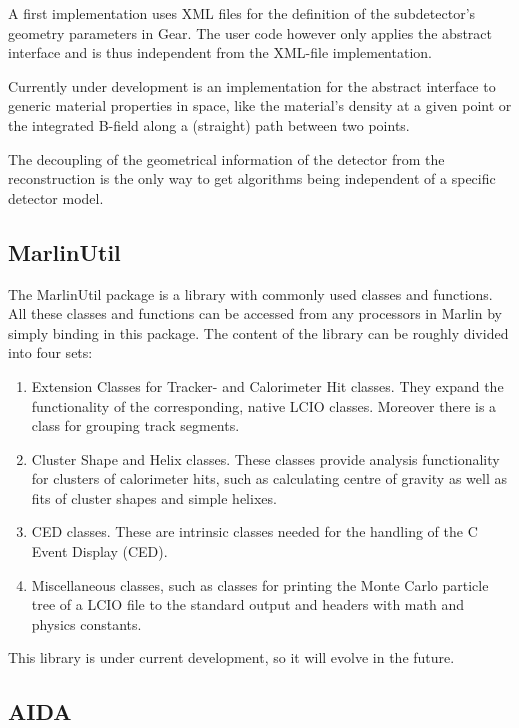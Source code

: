 A first implementation uses XML files for the definition of the
subdetector's geometry parameters in Gear. The user code however only applies
the abstract interface and is thus independent from the XML-file
implementation.

Currently under development is an
implementation for the abstract interface to generic material
properties in space, like the material's density at a given point or
the integrated B-field along a (straight) path between two points.

The decoupling of the geometrical
information of the detector from the reconstruction is the only way to get
algorithms being independent of a specific detector model.

\subsection{MarlinUtil}

The MarlinUtil package is a library with commonly used classes and functions.
All these classes and functions can be accessed from any processors in
Marlin by simply binding in this package. The content of the library can be
roughly divided into four sets:

\begin{enumerate}
\item Extension Classes for Tracker- and Calorimeter Hit classes.
      They expand the functionality of the corresponding, native LCIO classes.
      Moreover there is a class for grouping track segments.
\item Cluster Shape and Helix classes. These classes provide analysis
      functionality for clusters of calorimeter hits, such as calculating
      centre of gravity as well as fits of cluster shapes and simple helixes.
\item CED classes. These are intrinsic classes needed for the handling of the
      C Event Display (CED).
\item Miscellaneous classes, such as classes for printing the Monte Carlo
      particle tree of a LCIO file to the standard output and headers with
      math and physics constants.
\end{enumerate}

This library is under current development, so it will evolve in the future.

\subsection{AIDA}

